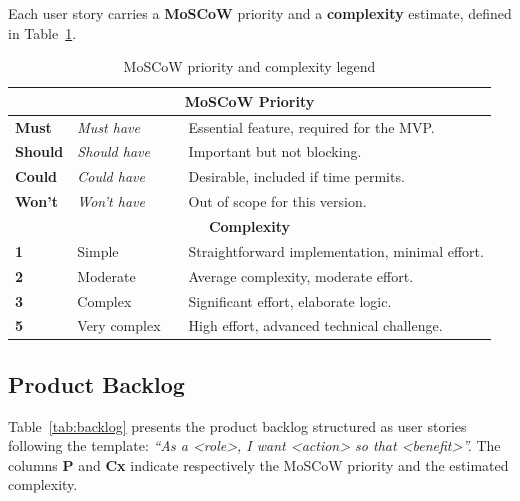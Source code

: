 \documentclass[12pt, a4paper, oneside]{report}
\begin{document}
Each user story carries a \textbf{MoSCoW} priority and a
\textbf{complexity} estimate, defined in Table~\ref{tab:moscow}.

\begin{table}[H]
  \centering
  \caption{MoSCoW priority and complexity legend}
  \label{tab:moscow}
  \begin{tabularx}{\textwidth}{lllX}
    \toprule
    \multicolumn{4}{c}{\textbf{MoSCoW Priority}} \\
    \midrule
    \cellcolor{moscowMust}\textbf{Must}     & \textit{Must have}   & & Essential feature, required for the MVP. \\
    \cellcolor{moscowShould}\textbf{Should} & \textit{Should have} & & Important but not blocking. \\
    \cellcolor{moscowCould}\textbf{Could}   & \textit{Could have}  & & Desirable, included if time permits. \\
    \cellcolor{moscowWont}\textbf{Won't}    & \textit{Won't have}  & & Out of scope for this version. \\
    \midrule
    \multicolumn{4}{c}{\textbf{Complexity}} \\
    \midrule
    \cellcolor{complexLow}\textbf{1}   & Simple      & & Straightforward implementation, minimal effort. \\
    \cellcolor{complexMed}\textbf{2}   & Moderate    & & Average complexity, moderate effort. \\
    \cellcolor{complexHigh}\textbf{3}  & Complex     & & Significant effort, elaborate logic. \\
    \cellcolor{complexVHigh}\textbf{5} & Very complex & & High effort, advanced technical challenge. \\
    \bottomrule
  \end{tabularx}
\end{table}

\subsection{Product Backlog}

Table~\ref{tab:backlog} presents the product backlog structured as
user stories following the template: \textit{``As a \textless{}role\textgreater{},
I want \textless{}action\textgreater{} so that \textless{}benefit\textgreater{}''.}
The columns \textbf{P} and \textbf{Cx} indicate respectively the
MoSCoW priority and the estimated complexity.
\end{document}
